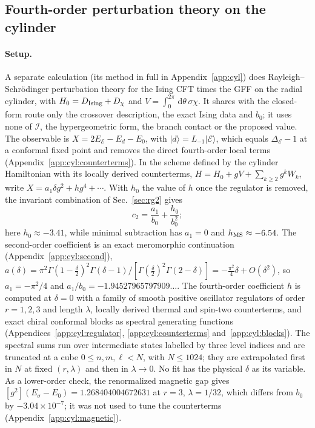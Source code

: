 \documentclass[11pt,a4paper]{article}
\numberwithin{equation}{section}
\newcommand{\dd}{\,\mathrm d}
\newcommand{\De}{\Delta_{\mathcal E}}
\newcommand{\cI}{\mathcal I}
\newcommand{\hMS}{h_{\rm MS}}
\newcommand{\ket}[1]{\lvert#1\rangle}
\newcommand{\sci}[2]{#1\times10^{#2}}
\begin{document}
\subsection{Fourth-order perturbation theory on the cylinder}\label{sec:cyl}
\paragraph{Setup.} A separate calculation (its method in full in Appendix~\ref{app:cyl}) does Rayleigh--Schr\"odinger
perturbation theory for the Ising CFT times the GFF on the radial cylinder, with $H_0=D_{\rm Ising}+D_\chi$ and $V=\int_0^{2\pi}\dd\theta\,\sigma\chi$. It shares
with the closed-form route only the crossover description, the exact Ising data and $b_0$; it uses none of $\cI$,
the hypergeometric form, the branch contact or the proposed value. The observable is
$X=2E_{\mathcal E}-E_d-E_0$, with $\ket d=L_{-1}\ket{\mathcal E}$, which equals $\De-1$ at a conformal fixed point and
removes the direct fourth-order local terms (Appendix~\ref{app:cyl:counterterms}). In the scheme defined by the cylinder Hamiltonian with its locally
derived counterterms, $H=H_0+gV+\sum_{k\ge2}g^kW_k$, write $X=a_1\delta g^2+hg^4+\cdots$. With $h_0$ the value of $h$
once the regulator is removed, the invariant combination of Sec.~\ref{sec:rg2} gives
\begin{equation}
 c_2=\frac{a_1}{b_0}+\frac{h_0}{b_0^2};
\end{equation}
here $h_0\approx-3.41$, while minimal subtraction has $a_1=0$ and $\hMS\approx-6.54$. The second-order coefficient is
an exact meromorphic continuation (Appendix~\ref{app:cyl:second}),
$a(\delta)=\pi^2\Gamma(1-\frac\delta2)^2\Gamma(\delta-1)/[\Gamma(\frac\delta2)^2\Gamma(2-\delta)]=-\frac{\pi^2}4\delta+O(\delta^2)$,
so $a_1=-\pi^2/4$ and $a_1/b_0=-1.94527965797909\ldots$. The fourth-order coefficient $h$ is computed at $\delta=0$
with a family of smooth positive oscillator regulators of order $r=1,2,3$ and length $\lambda$, locally derived thermal
and spin-two counterterms, and exact chiral conformal blocks as spectral generating functions
(Appendices~\ref{app:cyl:regulator}, \ref{app:cyl:counterterms} and~\ref{app:cyl:blocks}). The spectral sums run
over intermediate states labelled by three level indices and are truncated at a cube $0\le n,m,\ell<N$, with
$N\le1024$; they are extrapolated first in $N$ at fixed $(r,\lambda)$ and then in $\lambda\to0$. No fit has the
physical $\delta$ as its variable. As a lower-order check, the renormalized magnetic gap gives
$[g^2](E_\sigma-E_0)=1.268404004672631$ at $r=3$, $\lambda=1/32$, which differs from $b_0$ by $\sci{-3.04}{-7}$; it
was not used to tune the counterterms (Appendix~\ref{app:cyl:magnetic}).
\end{document}

